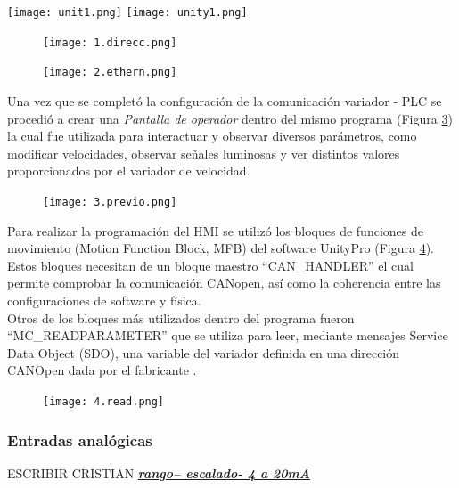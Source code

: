 \begin{center}
	\texttt{[image: unit1.png]}
	\label{fig:uni1}
	\texttt{[image: unity1.png]}
	\label{fig:uni0}
\end{center}

\begin{figure}[h]
	\centering
	\texttt{[image: 1.direcc.png]}
	\label{fig:direcc}
\end{figure}


\begin{figure}[h]
	\centering
	\texttt{[image: 2.ethern.png]}
	\label{fig:inter}
\end{figure}

Una vez que se completó la configuración de la comunicación variador - PLC se procedió a crear una \textit{Pantalla de operador} dentro del mismo programa (Figura \ref{fig:previo})
la cual fue utilizada para interactuar y observar diversos parámetros, como modificar velocidades, observar señales luminosas y ver distintos valores proporcionados por el variador de velocidad.
 
\begin{figure}[H]
	\centering
	\texttt{[image: 3.previo.png]}
	\label{fig:previo}
\end{figure}

Para realizar la programación del HMI se utilizó los bloques de funciones de movimiento (Motion Function Block, MFB) del software UnityPro (Figura \ref{fig:read}). Estos bloques necesitan de un bloque maestro ``CAN\_HANDLER'' el cual permite comprobar la comunicación CANopen, así como la coherencia
entre las configuraciones de software y física.
\\
Otros de los bloques más utilizados dentro del programa fueron ``MC\_READPARAMETER'' que se utiliza para leer, mediante mensajes Service Data Object
(SDO), una variable del variador definida en una dirección CANOpen dada por el fabricante \cite{ComManual}.

\begin{figure}[H]
	\centering
	\texttt{[image: 4.read.png]}
	\label{fig:read}
\end{figure}



\subsubsection{Entradas analógicas}
ESCRIBIR CRISTIAN
\underline{\textit{\textbf{rango-- escalado- 4 a 20mA}}}
